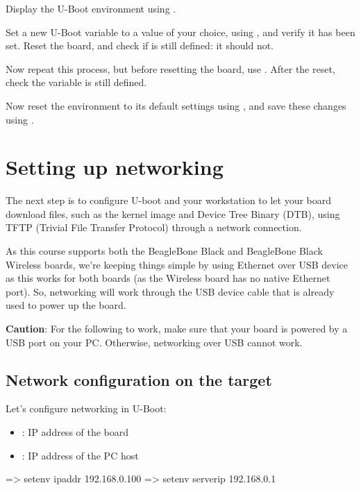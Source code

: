 Display the U-Boot environment using .

Set a new U-Boot variable  to a value of your choice, using
, and verify it has been set. Reset the board, and check
if  is still defined: it should not.

Now repeat this process, but before resetting the board, use
. After the reset, check the  variable is
still defined.

Now reset the environment to its default settings using , and save these changes using .

\section{Setting up networking}

The next step is to configure U-boot and your workstation to let your board
download files, such as the kernel image and Device Tree Binary (DTB), using
TFTP (Trivial File Transfer Protocol) through a network connection.

As this course supports both the BeagleBone Black and BeagleBone Black
Wireless boards, we're keeping things simple by using Ethernet over USB
device as this works for both boards (as the Wireless board has no
native Ethernet port). So, networking will work through the USB device
cable that is already used to power up the board.

{\bf Caution}: For the following to work, make sure that your board
is powered by a USB port on your PC. Otherwise, networking over USB
cannot work.

\subsection{Network configuration on the target}

Let's configure networking in U-Boot:

\begin{itemize}
  \item {}: IP address of the board
  \item {}: IP address of the PC host
\end{itemize}

\begin{ubootinput}
=> setenv ipaddr 192.168.0.100
=> setenv serverip 192.168.0.1
\end{ubootinput}

